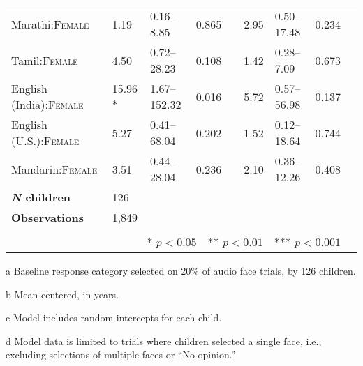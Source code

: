 \begin{table}[ht]
\begin{threeparttable}
\begin{tabular}{lllrllllr}
 Marathi:\textsc{Female}  & 1.19 & 0.16--8.85 & 0.865 &  & 2.95 & 0.50--17.48 & 0.234 \\ 
 Tamil:\textsc{Female}  & 4.50 & 0.72--28.23 & 0.108 &  & 1.42 & 0.28--7.09 & 0.673 \\ 
 English (India):\textsc{Female}  & 15.96 * & 1.67--152.32 & 0.016 &  & 5.72 & 0.57--56.98 & 0.137 \\ 
 English (U.S.):\textsc{Female}  & 5.27 & 0.41--68.04 & 0.202 &  & 1.52 & 0.12--18.64 & 0.744 \\ 
 Mandarin:\textsc{Female}  & 3.51 & 0.44--28.04 & 0.236 &  & 2.10 & 0.36--12.26 & 0.408 \\ 
\midrule
\bfseries{\textit{N} children}\tnote{c} & 126   &  &  &  &  &  &  \\
\textbf{Observations}\tnote{d} & 1,849  &  &  &  &  &  &  \\
\bottomrule\\[-.75em]
\multicolumn{8}{r}{* $p<0.05$~~** $p<0.01$~~*** $p<0.001$}\\
\end{tabular}
\begin{tablenotes}[flushleft]
    \item[a] Baseline response category selected on 20\% of audio face trials, by 126 children. %
    \item[b] Mean-centered, in years.
    \item[c] Model includes random intercepts for each child.
    \item[d] Model data is limited to trials where children selected a single face, i.e., excluding selections of multiple faces or ``No opinion.'' 
\end{tablenotes}
\end{threeparttable}
\end{table}
